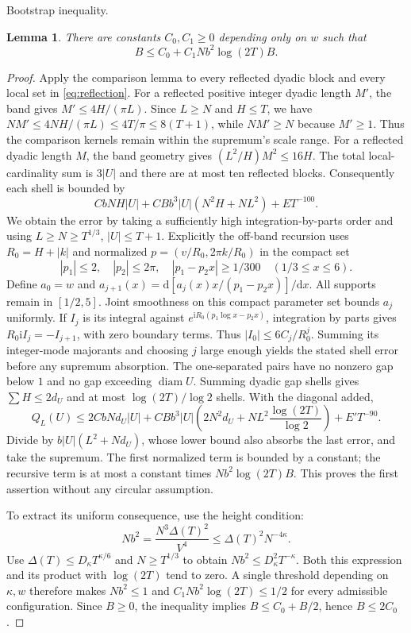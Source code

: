 \documentclass[11pt,a4paper]{article}
\numberwithin{equation}{section}
\newtheorem{lemma}[theorem]{Lemma}
\theoremstyle{definition}
\newcommand{\ii}{\mathrm i}
\newcommand{\diam}{\operatorname{diam}}
\begin{document}
\par\medskip\noindent Bootstrap inequality.
\begin{lemma}\label{lem:boot}
There are constants $C_0,C_1\ge0$ depending only on $w$ such that
\[
 B\le C_0+C_1Nb^2\log(2T)B.
\]
\end{lemma}
\begin{proof}
Apply the comparison lemma to every reflected dyadic block and every local set
in \eqref{eq:reflection}. For a reflected positive integer dyadic length $M'$, the band gives
$M'\le4H/(\pi L)$. Since $L\ge N$ and $H\le T$, we have
$NM'\le4NH/(\pi L)\le4T/\pi\le8(T+1)$, while $NM'\ge N$
because $M'\ge1$. Thus the comparison kernels remain within the
supremum's scale range.
For a reflected dyadic length $M$, the band geometry gives
$(L^2/H)M^2\le16H$. The total local-cardinality sum is $3|U|$ and there are
at most ten reflected blocks. Consequently each shell is bounded by
\[
 CbNH|U|+CBb^3|U|(N^2H+NL^2)+E T^{-100}.
\]
We obtain the error by taking a sufficiently high integration-by-parts
order and using $L\ge N\ge T^{1/3}$, $|U|\le T+1$.
Explicitly the off-band recursion uses $R_0=H+|k|$ and normalized
$p=(v/R_0,2\pi k/R_0)$ in the compact set
\[
 |p_1|\le2,\quad |p_2|\le2\pi,\quad
 |p_1-p_2x|\ge1/300\quad(1/3\le x\le6).
\]
Define $a_0=w$ and
$a_{j+1}(x)=\mathrm d[ a_j(x)x/(p_1-p_2x)]/\mathrm dx$.
All supports remain in $[1/2,5]$. Joint smoothness on this compact parameter
set bounds $a_j$ uniformly. If $I_j$ is its integral against
$e^{\ii R_0(p_1\log x-p_2x)}$, integration by parts gives
$R_0\ii I_j=-I_{j+1}$, with zero boundary terms.
Thus $|I_0|\le6C_j/R_0^j$. Summing its integer-mode majorants and choosing
$j$ large enough yields the stated shell error before any supremum absorption.
The one-separated pairs have no nonzero gap below $1$ and no gap exceeding
$\diam U$. Summing dyadic gap shells gives
$\sum H\le2d_U$ and at most $\log(2T)/\log2$ shells. With the diagonal added,
\[
 Q_L(U)\le2CbNd_U|U|
 +CBb^3|U|\left(2N^2d_U+NL^2\frac{\log(2T)}{\log2}\right)
 +E'T^{-90}.
\]
Divide by $b|U|(L^2+Nd_U)$, whose lower bound also absorbs the last error,
and take the supremum. The first normalized term is bounded by a constant;
the recursive term is at most a constant times $Nb^2\log(2T)B$.
This proves the first assertion without any circular assumption.

To extract its uniform consequence, use the height condition:
\[
 Nb^2=\frac{N^3\Delta(T)^2}{V^4}
 \le\Delta(T)^2N^{-4\kappa}.
\]
Use $\Delta(T)\le D_\kappa T^{\kappa/6}$ and $N\ge T^{1/3}$ to obtain
$Nb^2\le D_\kappa^2T^{-\kappa}$. Both this expression and its product
with $\log(2T)$ tend to zero. A single threshold depending on $\kappa,w$
therefore makes $Nb^2\le1$ and $C_1Nb^2\log(2T)\le1/2$ for every
admissible configuration. Since $B\ge0$, the inequality implies
$B\le C_0+B/2$, hence $B\le2C_0$.
\end{proof}
\end{document}
